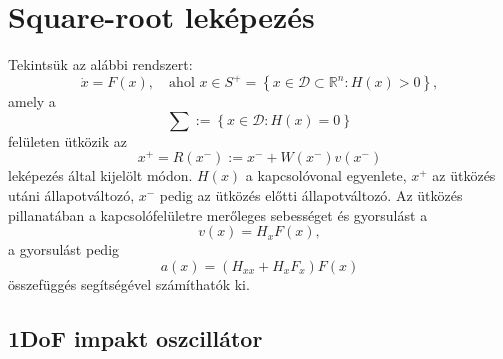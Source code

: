 \chapter{\label{sec:square_root}Square-root leképezés}


Tekintsük az alábbi rendszert:
\begin{equation}
\dot{x}=F(x), \quad \text{ahol } x\in S^+=\left\{x\in\mathcal{D}\subset\mathbb{R}^n: H(x)>0\right\},
\end{equation}
amely a 
\begin{equation}
\sum:=\left\{x\in\mathcal{D}: H(x)=0\right\}
\end{equation}
felületen ütközik az
\begin{equation}
x^+=R(x^-):=x^-+W(x^-)v(x^-)
\end{equation}
leképezés által kijelölt módon. $H(x)$ a kapcsolóvonal egyenlete, $x^+$ az ütközés utáni állapotváltozó, $x^-$ pedig az ütközés előtti állapotváltozó. Az ütközés pillanatában a kapcsolófelületre merőleges sebességet és gyorsulást a 
\begin{equation}
v(x)=H_xF(x), 
\end{equation} 
a gyorsulást pedig 
\begin{equation}
 a(x)=(H_{xx}+H_xF_x)F(x)
\end{equation} 
összefüggés segítségével számíthatók ki.

\section{1DoF impakt oszcillátor}



